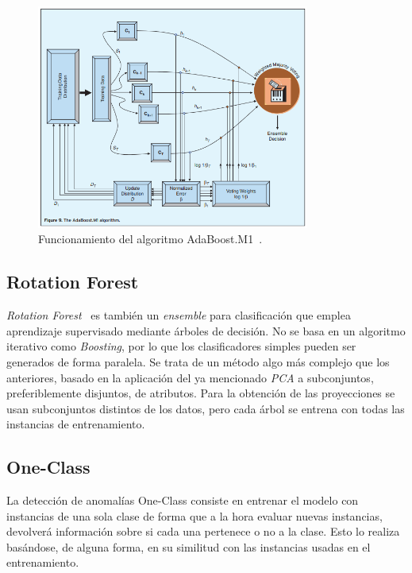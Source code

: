 \begin{figure}[H]
	\centering
	\includegraphics[width=0.8\textwidth]{../img/adaboostm1.png}
	\caption[Funcionamiento del algoritmo AdaBoost.M1.]{Funcionamiento del algoritmo AdaBoost.M1~\cite{polikar2006ensemble}.}
	\label{fig:adaboostm1}
\end{figure}

\subsection{Rotation Forest}

\textit{Rotation Forest}~\cite{rodriguez2006rotation} es también un \textit{ensemble} para clasificación que emplea aprendizaje supervisado mediante árboles de decisión. No se basa en un algoritmo iterativo como \textit{Boosting}, por lo que los clasificadores simples pueden ser generados de forma paralela. Se trata de un método algo más complejo que los anteriores, basado en la aplicación del ya mencionado \textit{PCA} a subconjuntos, preferiblemente disjuntos, de atributos. Para la obtención de las proyecciones se usan subconjuntos distintos de los datos, pero cada árbol se entrena con todas las instancias de entrenamiento. 

\subsection{One-Class}

La detección de anomalías One-Class consiste en entrenar el modelo con instancias de una sola clase de forma que a la hora evaluar nuevas instancias, devolverá información sobre si cada una pertenece o no a la clase. Esto lo realiza basándose, de alguna forma, en su similitud con las instancias usadas en el entrenamiento. 

